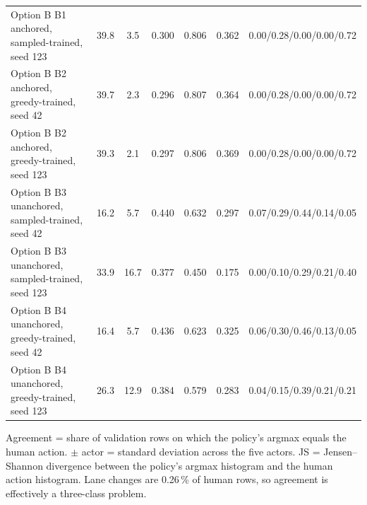 \begin{table}[t]
{\begin{tabular}{lcccccc}
Option B B1 anchored, sampled-trained, seed 123 & 39.8 & 3.5 & 0.300 & 0.806 & 0.362 & 0.00/0.28/0.00/0.00/0.72 \\
Option B B2 anchored, greedy-trained, seed 42 & 39.7 & 2.3 & 0.296 & 0.807 & 0.364 & 0.00/0.28/0.00/0.00/0.72 \\
Option B B2 anchored, greedy-trained, seed 123 & 39.3 & 2.1 & 0.297 & 0.806 & 0.369 & 0.00/0.28/0.00/0.00/0.72 \\
Option B B3 unanchored, sampled-trained, seed 42 & 16.2 & 5.7 & 0.440 & 0.632 & 0.297 & 0.07/0.29/0.44/0.14/0.05 \\
Option B B3 unanchored, sampled-trained, seed 123 & 33.9 & 16.7 & 0.377 & 0.450 & 0.175 & 0.00/0.10/0.29/0.21/0.40 \\
Option B B4 unanchored, greedy-trained, seed 42 & 16.4 & 5.7 & 0.436 & 0.623 & 0.325 & 0.06/0.30/0.46/0.13/0.05 \\
Option B B4 unanchored, greedy-trained, seed 123 & 26.3 & 12.9 & 0.384 & 0.579 & 0.283 & 0.04/0.15/0.39/0.21/0.21 \\
\bottomrule
\end{tabular}}
\vspace{1mm}
\parbox{\textwidth}{\scriptsize Agreement = share of validation rows on which the policy's argmax equals the human action. $\pm$ actor = standard deviation across the five actors. JS = Jensen--Shannon divergence between the policy's argmax histogram and the human action histogram. Lane changes are 0.26\,\% of human rows, so agreement is effectively a three-class problem.}
\end{table}
